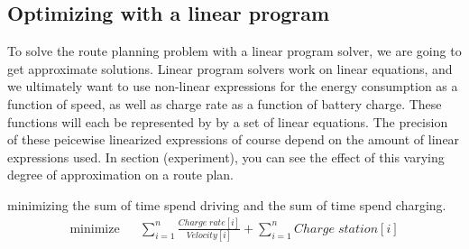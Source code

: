 \subsection{Optimizing with a linear program}
To solve the route planning problem with a linear program solver, we are going to get approximate solutions. Linear program solvers work on linear equations, and we ultimately want to use non-linear expressions for the energy consumption as a function of speed, as well as charge rate as a function of battery charge. These functions will each be represented by by a set of linear equations. The precision of these peicewise linearized expressions of course depend on the amount of linear expressions used. In section (experiment), you can see the effect of this varying degree of approximation on a route plan.


minimizing the sum of time spend driving and the sum of time spend charging. 
\begin{equation}
\begin{aligned}
{\text{minimize}}
& & \sum_{i=1}^{n} \frac{Charge\;rate[i]}{Velocity[i]} + \sum_{i=1}^{n} Charge\;station[i] \\
\end{aligned}
\end{equation}\label{eq:objfunction}

